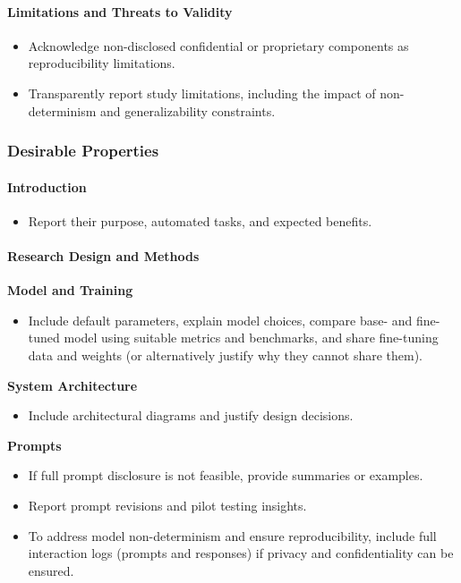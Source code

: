 \paragraph{Limitations and Threats to Validity}
\begin{itemize}[label=$\square$]
    \item Acknowledge non-disclosed confidential or proprietary components as reproducibility limitations.
    \item Transparently report study limitations, including the impact of non-determinism and generalizability constraints.
\end{itemize}

\subsubsection{Desirable Properties}

\paragraph{Introduction}
\begin{itemize}[label=$\square$]
    \item Report their purpose, automated tasks, and expected benefits.
\end{itemize}

\paragraph{Research Design and Methods}


\textbf{Model and Training}
\begin{itemize}[label=$\square$]
    \item Include default parameters, explain model choices, compare base- and fine-tuned model using suitable metrics and benchmarks, and share fine-tuning data and weights (or alternatively justify why they cannot share them).
\end{itemize}

\textbf{System Architecture}
\begin{itemize}[label=$\square$]
    \item Include architectural diagrams and justify design decisions.
\end{itemize}

\textbf{Prompts}
\begin{itemize}[label=$\square$]
    \item If full prompt disclosure is not feasible, provide summaries or examples.
    \item Report prompt revisions and pilot testing insights.
    \item To address model non-determinism and ensure reproducibility, include full interaction logs (prompts and responses) if privacy and confidentiality can be ensured.
\end{itemize}

